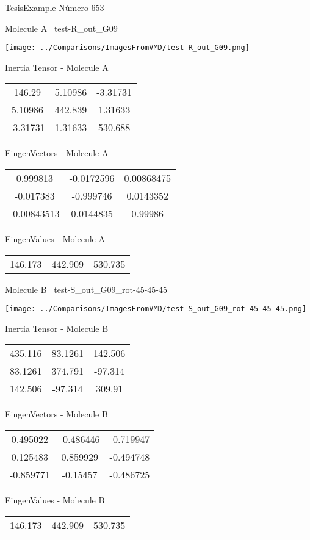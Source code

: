 \vtab[-3cm]
\begin{center}
{\large TesisExample \tab Número 653}
\end{center}
\begin{multicols}{2}
\begin{center}

Molecule A \
test-R\_out\_G09

\texttt{[image: ../Comparisons/ImagesFromVMD/test-R\_out\_G09.png]}

Inertia Tensor - Molecule A \\
\begin{tabular}{|c c c|}
146.29	 & 	5.10986	 & 	-3.31731	 \\
5.10986	 & 	442.839	 & 	1.31633	 \\
-3.31731	 & 	1.31633	 & 	530.688
\end{tabular}

\vtab
 EingenVectors - Molecule A     \\
\begin{tabular}{|c c c|}
0.999813	 & 	-0.0172596	 & 	0.00868475	 \\
-0.017383	 & 	-0.999746	 & 	0.0143352	 \\
-0.00843513	 & 	0.0144835	 & 	0.99986
\end{tabular}

\vtab
 EingenValues - Molecule A     \\
\begin{tabular}{|c c c|}
146.173	 & 	442.909	 & 	530.735	 \\
\end{tabular}
\columnbreak

Molecule B \
test-S\_out\_G09\_rot-45-45-45

\texttt{[image: ../Comparisons/ImagesFromVMD/test-S\_out\_G09\_rot-45-45-45.png]}

Inertia Tensor - Molecule B \\
\begin{tabular}{|c c c|}
435.116	 & 	83.1261	 & 	142.506	 \\
83.1261	 & 	374.791	 & 	-97.314	 \\
142.506	 & 	-97.314	 & 	309.91
\end{tabular}

\vtab
 EingenVectors - Molecule B     \\
\begin{tabular}{|c c c|}
0.495022	 & 	-0.486446	 & 	-0.719947	 \\
0.125483	 & 	0.859929	 & 	-0.494748	 \\
-0.859771	 & 	-0.15457	 & 	-0.486725
\end{tabular}

\vtab
 EingenValues - Molecule B     \\
\begin{tabular}{|c c c|}
146.173	 & 	442.909	 & 	530.735	 \\
\end{tabular}

\end{center}
\end{multicols}

